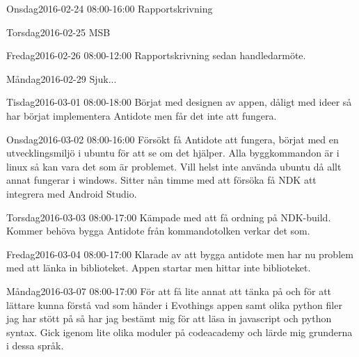 \documentclass[a4paper,oneside]{book}
\begin{document}
\begin{diary}{Onsdag}{2016-02-24 08:00-16:00}
	Rapportskrivning
\end{diary}

\begin{diary}{Torsdag}{2016-02-25}
	MSB
\end{diary}

\begin{diary}{Fredag}{2016-02-26 08:00-12:00}
	Rapportskrivning sedan handledarmöte.
\end{diary}

\begin{diary}{Måndag}{2016-02-29}
	Sjuk...
\end{diary}

\begin{diary}{Tisdag}{2016-03-01 08:00-18:00}
	Börjat med designen av appen, dåligt med ideer så har börjat implementera Antidote men får det inte att fungera.
\end{diary}

\begin{diary}{Onsdag}{2016-03-02 08:00-16:00}
	Försökt få Antidote att fungera, börjat med en utvecklingsmiljö i ubuntu för att se om det hjälper. Alla byggkommandon är i linux så kan vara det som är problemet. Vill helst inte använda ubuntu då allt annat fungerar i windows. Sitter nån timme med att försöka få NDK att integrera med Android Studio.
\end{diary}

\begin{diary}{Torsdag}{2016-03-03 08:00-17:00}
	Kämpade med att få ordning på NDK-build. Kommer behöva bygga Antidote från kommandotolken verkar det som.
\end{diary}

\begin{diary}{Fredag}{2016-03-04 08:00-17:00}
	Klarade av att bygga antidote men har nu problem med att länka in biblioteket. Appen startar men hittar inte biblioteket.
\end{diary}
\newpage

\begin{diary}{Måndag}{2016-03-07 08:00-17:00}
	För att få lite annat att tänka på och för att lättare kunna förstå vad som händer i Evothings appen samt olika python filer jag har stött på så har jag bestämt mig för att läsa in javascript och python syntax. Gick igenom lite olika moduler på codeacademy och lärde mig grunderna i dessa språk.
\end{diary}
\end{document}
